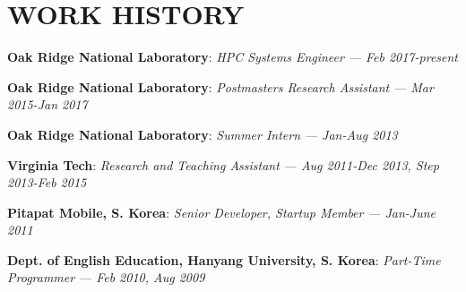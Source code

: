 \section{WORK HISTORY} 
\vspace{0.03in} 

{\bf Oak Ridge National Laboratory}: \emph{HPC Systems Engineer}
{\it \footnotesize --- Feb 2017-present}
\vspace{-0.15in}

{\bf Oak Ridge National Laboratory}: \emph{Postmasters Research Assistant}
{\it \footnotesize --- Mar 2015-Jan 2017}
\vspace{-0.15in}

{\bf Oak Ridge National Laboratory}: \emph{Summer Intern}
{\it \footnotesize --- Jan-Aug 2013}
\vspace{-0.15in}

{\bf Virginia Tech}: \emph{Research and Teaching Assistant}
{\it \footnotesize --- Aug 2011-Dec 2013, Step 2013-Feb 2015}
\vspace{-0.15in}

{\bf Pitapat Mobile, S. Korea}: \emph{Senior Developer, Startup Member}
{\it \footnotesize --- Jan-June 2011}
\vspace{-0.15in}

{\bf Dept. of English Education, Hanyang University, S. Korea}: \emph{Part-Time Programmer}
{\it \footnotesize --- Feb 2010, Aug 2009}
\vspace{-0.15in}

